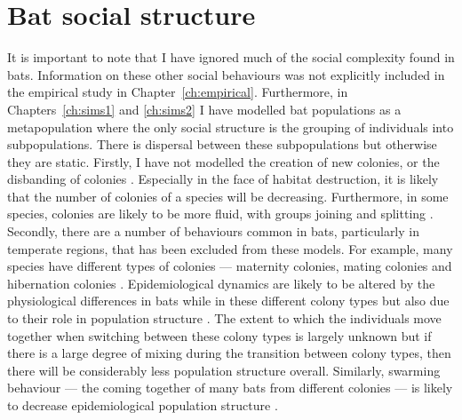 


\section{Bat social structure}

It is important to note that I have ignored much of the social complexity found in bats.
Information on these other social behaviours was not explicitly included in the empirical study in Chapter~\ref{ch:empirical}.
Furthermore, in Chapters~\ref{ch:sims1} and \ref{ch:sims2} I have modelled bat populations as a metapopulation where the only social structure is the grouping of individuals into subpopulations.
There is dispersal between these subpopulations but otherwise they are static.
Firstly, I have not modelled the creation of new colonies, or the disbanding of colonies \cite{metheny2008genetic}.
Especially in the face of habitat destruction, it is likely that the number of colonies of a species will be decreasing.
Furthermore, in some species, colonies are likely to be more fluid, with groups joining and splitting \cite{kerth2012causes, august2014sympatric}.
Secondly, there are a number of behaviours common in bats, particularly in temperate regions, that has been excluded from these models.
For example, many species have different types of colonies --- maternity colonies, mating colonies and hibernation colonies \cite{kerth2008causes}.
Epidemiological dynamics are likely to be altered by the physiological differences in bats while in these different colony types  but also due to their role in population structure \cite{george2011host, langwig2015host, blehert2012fungal, webber2016social}.
The extent to which the individuals move together when switching between these colony types is largely unknown \cite{kurta2002philopatry, baerwald2016migratory} but if there is a large degree of mixing during the transition between colony types, then there will be considerably less population structure overall.
Similarly, swarming behaviour --- the coming together of many bats from different colonies --- is likely to decrease epidemiological population structure \cite{kerth2012causes}.


